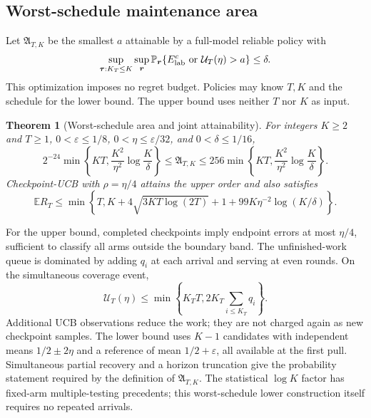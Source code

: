 \documentclass[11pt]{article}
\newtheorem{theorem}{Theorem}[section]
\theoremstyle{remark}
\newcommand{\E}{\mathbb E}
\newcommand{\Prob}{\mathbb P}
\begin{document}
\subsection{Worst-schedule maintenance area}

Let $\mathfrak A_{T,K}$ be the smallest $a$ attainable by a full-model reliable
policy with
\[
 \sup_{\boldsymbol\tau:K_T\le K}\sup_{\boldsymbol r}
 \Prob_{\boldsymbol r}\{E_{\rm lab}^c\ \text{or}\ \mathcal U_T(\eta)>a\}\le\delta.
\]
This optimization imposes no regret budget. Policies may know $T,K$ and the
schedule for the lower bound. The upper bound uses neither $T$ nor $K$ as
input.

\begin{theorem}[Worst-schedule area and joint attainability]
\label{thm:worst_area}
For integers $K\ge2$ and $T\ge1$, $0<\varepsilon\le1/8$,
$0<\eta\le\varepsilon/32$, and $0<\delta\le1/16$,
\begin{equation}
 2^{-24}\min\left\{KT,\frac{K^2}{\eta^2}\log\frac K\delta\right\}
 \le\mathfrak A_{T,K}\le
 256\min\left\{KT,\frac{K^2}{\eta^2}\log\frac K\delta\right\}.
 \label{eq:worst_area}
\end{equation}
Checkpoint-UCB with $\rho=\eta/4$ attains the upper order and also satisfies
\begin{equation}
 \E R_T\le\min\left\{T,K+4\sqrt{3KT\log(2T)}+1+
                         99K\eta^{-2}\log(K/\delta)\right\}.
 \label{eq:joint_general}
\end{equation}
\end{theorem}

For the upper bound, completed checkpoints imply endpoint errors at most
$\eta/4$, sufficient to classify all arms outside the boundary band. The
unfinished-work queue is dominated by adding $q_i$ at each arrival and serving
at even rounds. On the simultaneous coverage event,
\begin{equation}
 \mathcal U_T(\eta)\le\min\left\{K_TT,
                         2K_T\sum_{i\le K_T}q_i\right\}.
 \label{eq:queue_upper}
\end{equation}
Additional UCB observations reduce the work; they are not charged again as
new checkpoint samples. The lower bound uses $K-1$ candidates with independent
means $1/2\pm2\eta$ and a reference of mean $1/2+\varepsilon$, all available
at the first pull. Simultaneous partial recovery and a horizon truncation give
the probability statement required by the definition of $\mathfrak A_{T,K}$.
The statistical $\log K$ factor has fixed-arm multiple-testing precedents;
this worst-schedule lower construction itself requires no repeated arrivals.
\end{document}
